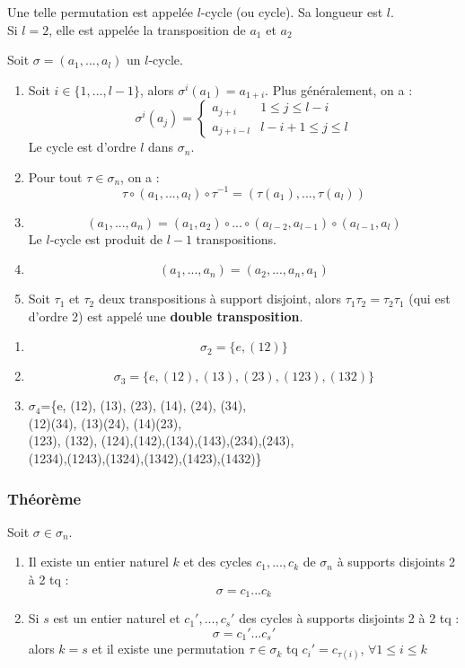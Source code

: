 \documentclass[a4paper, oneside]{report}
\theoremstyle{break}
\newcommand{\theo}{\subsubsection{Théorème}}
\begin{document}
Une telle permutation est appelée $l$-cycle (ou cycle). Sa longueur est $l$.\\
Si $l=2$, elle est appelée la transposition de $a_1$ et $a_2$

\remar
Soit $\sigma=(a_1,...,a_l)$ un $l$-cycle.
\begin{enumerate}
\item Soit $i\in \{1,...,l-1\}$, alors $\sigma^i(a_1)=a_{1+i}$. Plus généralement, on a :
$$\sigma^i(a_j)= \left\{\begin{array}{ll}
a_{j+i}& 1\leq j \leq l-i\\
a_{j+i-l}& l-i+1\leq j \leq l
\end{array}\right.$$
Le cycle est d'ordre $l$ dans $\sigma_n$.

\item Pour tout $\tau \in \sigma_n$, on a :
$$\tau \circ (a_1,...,a_l) \circ \tau^{-1}=(\tau(a_1),...,\tau(a_l))$$

\item 
$$ (a_1,...,a_n)=(a_1,a_2)\circ...\circ (a_{l-2}, a_{l-1}) \circ (a_{l-1}, a_l)$$
Le $l$-cycle est produit de $l-1$ transpositions.

\item 
$$(a_1,...,a_n)=(a_2,...,a_n,a_1)$$

\item Soit $\tau_1$ et $\tau_2$ deux transpositions à support disjoint, alors $\tau_1\tau_2 = \tau_2\tau_1$ (qui est d'ordre 2) est appelé une \textbf{double transposition}.
 
\end{enumerate}

\exem
\begin{enumerate}
\item $$\sigma_2=\{e, (12)\}$$
\item $$\sigma_3=\{e, (12), (13), (23), (123), (132)\}$$
\item
\begin{center}
$\sigma_4$=\{e, (12), (13), (23), (14), (24), (34),\\
(12)(34), (13)(24), (14)(23),\\
(123), (132), (124),(142),(134),(143),(234),(243),\\
(1234),(1243),(1324),(1342),(1423),(1432)\}
\end{center} 
\end{enumerate}

\theo
Soit $\sigma\in \sigma_n$.
\begin{enumerate}
\item Il existe un entier naturel $k$ et des cycles $c_1,...,c_k$ de $\sigma_n$ à supports disjoints 2 à 2 tq :
$$\sigma = c_1...c_k$$

\item Si $s$ est un entier naturel et $c_1',...,c_s'$ des cycles à supports disjoints 2 à 2 tq :
$$\sigma = c_1'...c_s'$$
alors $k=s$ et il existe une permutation $\tau \in \sigma_k$ tq $c_i'=c_{\tau(i)}$, $\forall 1\leq i \leq k$
\end{enumerate}
\end{document}
